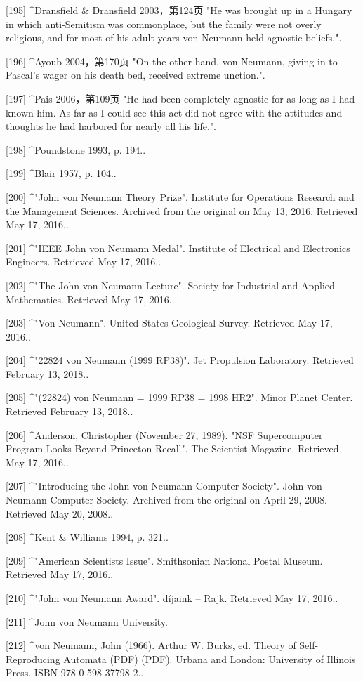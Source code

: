 [195]
^Dransfield & Dransfield 2003，第124页 "He was brought up in a Hungary in which anti-Semitism was commonplace, but the family were not overly religious, and for most of his adult years von Neumann held agnostic beliefs.".

[196]
^Ayoub 2004，第170页 "On the other hand, von Neumann, giving in to Pascal's wager on his death bed, received extreme unction.".

[197]
^Pais 2006，第109页 "He had been completely agnostic for as long as I had known him. As far as I could see this act did not agree with the attitudes and thoughts he had harbored for nearly all his life.".

[198]
^Poundstone 1993, p. 194..

[199]
^Blair 1957, p. 104..

[200]
^"John von Neumann Theory Prize". Institute for Operations Research and the Management Sciences. Archived from the original on May 13, 2016. Retrieved May 17, 2016..

[201]
^"IEEE John von Neumann Medal". Institute of Electrical and Electronics Engineers. Retrieved May 17, 2016..

[202]
^"The John von Neumann Lecture". Society for Industrial and Applied Mathematics. Retrieved May 17, 2016..

[203]
^"Von Neumann". United States Geological Survey. Retrieved May 17, 2016..

[204]
^"22824 von Neumann (1999 RP38)". Jet Propulsion Laboratory. Retrieved February 13, 2018..

[205]
^"(22824) von Neumann = 1999 RP38 = 1998 HR2". Minor Planet Center. Retrieved February 13, 2018..

[206]
^Anderson, Christopher (November 27, 1989). "NSF Supercomputer Program Looks Beyond Princeton Recall". The Scientist Magazine. Retrieved May 17, 2016..

[207]
^"Introducing the John von Neumann Computer Society". John von Neumann Computer Society. Archived from the original on April 29, 2008. Retrieved May 20, 2008..

[208]
^Kent & Williams 1994, p. 321..

[209]
^"American Scientists Issue". Smithsonian National Postal Museum. Retrieved May 17, 2016..

[210]
^"John von Neumann Award". díjaink – Rajk. Retrieved May 17, 2016..

[211]
^John von Neumann University.

[212]
^von Neumann, John (1966). Arthur W. Burks, ed. Theory of Self-Reproducing Automata (PDF) (PDF). Urbana and London: University of Illinois Press. ISBN 978-0-598-37798-2..